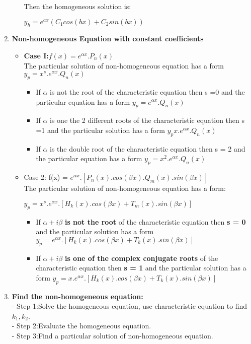 \documentclass[10pt]{article}
\begin{document}
\begin{enumerate}
\begin{itemize}
		 Then the homogeneous solution is:
		 \begin{mybox}
		 \begin{center}
		 $y_h = e^{ax} (C_1cos(bx) + C_2sin(bx))$
		 \end{center}
		 \end{mybox} 
	\end{itemize}
	\item \textbf{Non-homogeneous Equation with constant coefficients}
	\begin{itemize}
		\item \textbf{Case I:$f(x) = e^{\alpha x}.P_n(x)$}\\
		The particular solution of non-homogeneous equation has a form $y_p = x^s.e^{\alpha x}.Q_n(x)$
		\begin{itemize}
			\item If $\alpha$ is not the root of the characteristic equation then s =0 and the particular equation has a form $y_p = e^{\alpha x}.Q_n(x)$
			\item If $\alpha$ is one the 2 different roots of the characteristic equation then s =1 and the particular solution has a form $y_p x.e^{\alpha x}.Q_n(x)$
			\item If $\alpha$ is the double root of the characteristic equation then s = 2 and the particular equation has a form $y_p = x^2.e^{\alpha x}.Q_n(x)$
		\end{itemize}
		\item Case 2: f(x) = $e^{\alpha x}.[P_n(x).cos(\beta x).Q_m(x).sin(\beta x)]$\\
		The particular solution of non-homogeneous equation has a form:
		\begin{center}
		$y_p = x^s.e^{\alpha x}.[H_k(x).cos(\beta x) + T_m(x).sin(\beta x)]$
		\end{center}
		\begin{itemize}
			\item If $\alpha + i \beta$ \textbf{is not the root} of the characteristic equation then \textbf{s = 0} and the particular solution has a form $y_p = e^{\alpha x}.[H_k(x).cos(\beta x) + T_k(x).sin(\beta x)]$
			\item If $\alpha + i \beta$ \textbf{is one of the complex conjugate roots} of the characteristic equation then \textbf{s = 1} and the particular solution has a form $y_p = x.e^{\alpha x}.[H_k(x).cos(\beta x) + T_k(x).sin(\beta x)]$
		\end{itemize}
	\end{itemize}	
		\item \textbf{Find the non-homogeneous equation:}\\
		- Step 1:Solve the homogeneous equation, use characteristic equation to find $k_{1},k_{2}$.\\
		- Step 2:Evaluate the homogeneous equation.\\
		- Step 3:Find a particular solution of non-homogeneous equation. 
\end{enumerate}		   
\end{document}

